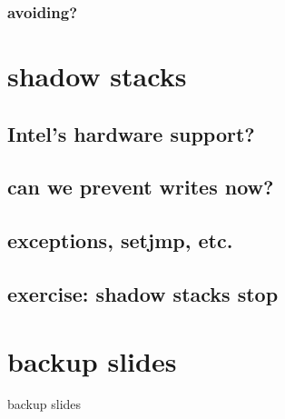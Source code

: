 \subsubsection{avoiding?}


\section{shadow stacks}


\subsection{Intel's hardware support?}


\subsection{can we prevent writes now?}


\subsection{exceptions, setjmp, etc.}


\subsection{exercise: shadow stacks stop}




\section{backup slides}
\begin{frame}{backup slides}
\end{frame}


